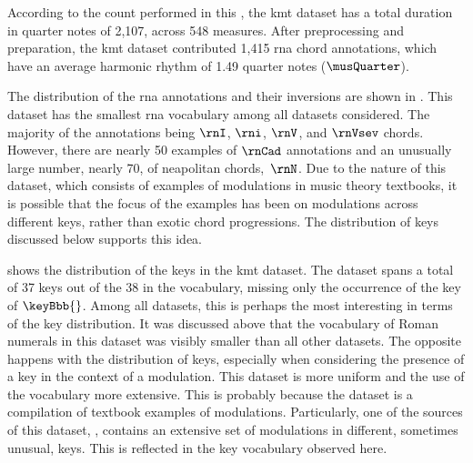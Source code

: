 
According to the count performed in this \thesisdiss{}, the
\gls{kmt} dataset has a total duration in quarter notes of
2,107, across 548 measures. After preprocessing and
preparation, the \gls{kmt} dataset contributed 1,415
\gls{rna} chord annotations, which have an average harmonic
rhythm of 1.49 quarter notes ($\musQuarter$).

The distribution of the \gls{rna} annotations and their
inversions are shown in . This
dataset has the smallest \gls{rna} vocabulary among all
datasets considered. The majority of the annotations being
$\rnI$, $\rni$, $\rnV$, and $\rnVsev$ chords. However, there
are nearly 50 examples of $\rnCad$ annotations and an
unusually large number, nearly 70, of \gls{neapolitan}
chords,~$\rnN$. Due to the nature of this dataset, which
consists of examples of modulations in music theory
textbooks, it is possible that the focus of the examples has
been on modulations across different keys, rather than
exotic chord progressions. The distribution of keys
discussed below supports this idea.



 shows the distribution of the keys
in the \gls{kmt} dataset. The dataset spans a total of 37
keys out of the 38 in the vocabulary, missing only the
occurrence of the key of $\keyBbb{}$. Among all datasets, this
is perhaps the most interesting in terms of the key
distribution. It was discussed above that the vocabulary of
Roman numerals in this dataset was visibly smaller than all
other datasets. The opposite happens with the distribution
of keys, especially when considering the presence of a key
in the context of a modulation. This dataset is more uniform
and the use of the vocabulary more extensive. This is
probably because the dataset is a compilation of textbook
examples of modulations. Particularly, one of the sources of
this dataset, \textcite{reger1904supplement}, contains an
extensive set of modulations in different, sometimes
unusual, keys. This is reflected in the key vocabulary
observed here.
